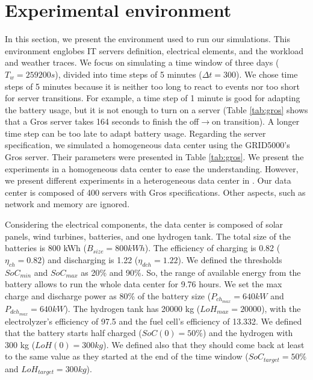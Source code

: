 \section{Experimental environment}
\label{sec:experiment_environment}

In this section, we present the environment used to run our simulations. This environment englobes IT servers definition, electrical elements, and the workload and weather traces. We focus on simulating a time window of three days ($T_{w}=259200 s$), divided into time steps of 5 minutes ($\Delta t=300$). We chose time steps of 5 minutes because it is neither too long to react to events nor too short for server transitions. For example, a time step of 1 minute is good for adapting the battery usage, but it is not enough to turn on a server (Table \ref{tab:gros} shows that a Gros server takes 164 seconds to finish the off$\rightarrow$on transition). A longer time step can be too late to adapt battery usage. Regarding the server specification, we simulated a homogeneous data center using the GRID5000's Gros server. Their parameters were presented in Table \ref{tab:gros}. We present the experiments in a homogeneous data center to ease the understanding. However, we present different experiments in a heterogeneous data center in \cite{de2022analyzing}. Our data center is composed of 400 servers with Gros specifications. Other aspects, such as network and memory are ignored. 

Considering the electrical components, the data center is composed of solar panels, wind turbines, batteries, and one hydrogen tank. The total size of the batteries is 800 kWh ($B_{size}=800kWh$). The efficiency of charging is 0.82 ($\eta_{ch}=0.82$) and discharging is 1.22 ($\eta_{dch}=1.22$). We defined the thresholds $SoC_{min}$ and $SoC_{max}$ as 20\% and 90\%. So, the range of available energy from the battery allows to run the whole data center for 9.76 hours. We set the max charge and discharge power as 80\% of the battery size ($P_{ch_{max}}=640kW$ and $P_{dch_{max}}=640kW$). The hydrogen tank has 20000 kg ($LoH_{max}=20000$), with the electrolyzer's efficiency of 97.5 and the fuel cell's efficiency of 13.332. We defined that the battery starts half charged ($SoC(0)=50\%$) and the hydrogen with 300 kg ($LoH(0)=300kg$). We defined also that they should come back at least to the same value as they started at the end of the time window ($SoC_{target} = 50\%$ and $LoH_{target}=300kg$).


